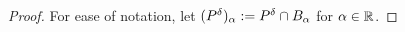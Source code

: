\begin{proof}
  For ease of notation, let $(P^\delta)_\alpha := \P\cap B_\alpha$ for $\alpha\in\R$.
%
%

\end{proof}
